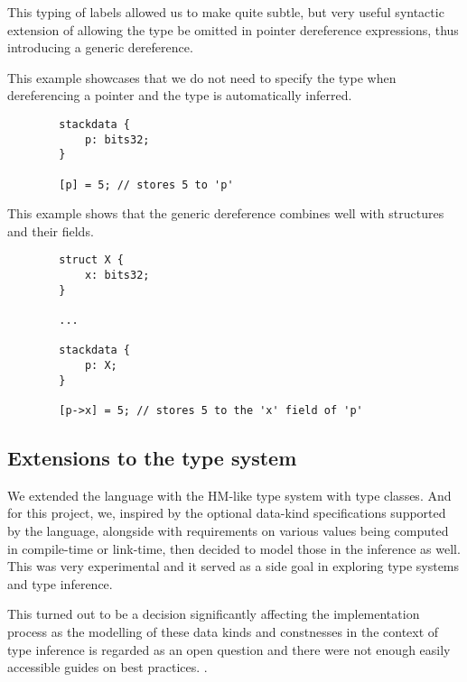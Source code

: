 This typing of labels allowed us to make quite subtle, but very useful syntactic extension of allowing the type be omitted in pointer dereference expressions, thus introducing a generic dereference.

\begin{ex}
    This example showcases that we do not need to specify the type when dereferencing a pointer and the type is automatically inferred.

    \begin{lstlisting}
        stackdata {
            p: bits32;
        }

        [p] = 5; // stores 5 to 'p'
    \end{lstlisting}
\end{ex}

\begin{ex}
    This example shows that the generic dereference combines well with structures and their fields.

    \begin{lstlisting}
        struct X {
            x: bits32;
        }

        ...

        stackdata {
            p: X;
        }

        [p->x] = 5; // stores 5 to the 'x' field of 'p'
    \end{lstlisting}
\end{ex}

\subsection{Extensions to the type system}

We extended the language with the HM-like type system with type classes. And for this project, we, inspired by the optional data-kind specifications supported by the \cmm language, alongside with requirements on various values being computed in compile-time or link-time, then decided to model those in the inference as well. This was very experimental and it served as a side goal in exploring type systems and type inference.

This turned out to be a decision significantly affecting the implementation process as the modelling of these data kinds and constnesses in the context of type inference is regarded as an open question and there were not enough easily accessible guides on best practices. .


